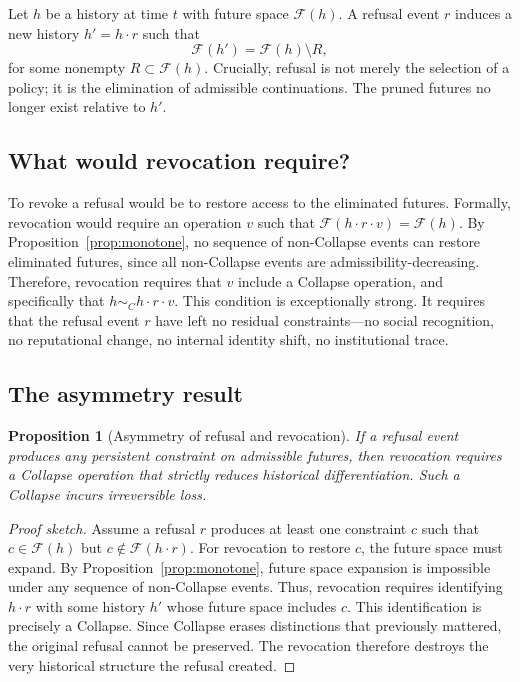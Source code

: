 \documentclass[11pt]{article}
\newtheorem{proposition}{Proposition}
\begin{document}
Let $h$ be a history at time $t$ with future space $\mathcal{F}(h)$. A refusal
event $r$ induces a new history $h' = h \cdot r$ such that
\[
\mathcal{F}(h') = \mathcal{F}(h) \setminus R,
\]
for some nonempty $R \subset \mathcal{F}(h)$. Crucially, refusal is not merely
the selection of a policy; it is the elimination of admissible continuations.
The pruned futures no longer exist relative to $h'$.

\subsection{What would revocation require?}

To revoke a refusal would be to restore access to the eliminated futures.
Formally, revocation would require an operation $v$ such that
$\mathcal{F}(h \cdot r \cdot v) = \mathcal{F}(h)$. By
Proposition~\ref{prop:monotone}, no sequence of non-Collapse events can restore
eliminated futures, since all non-Collapse events are admissibility-decreasing.
Therefore, revocation requires that $v$ include a Collapse operation, and
specifically that $h \sim_C h \cdot r \cdot v$. This condition is exceptionally
strong. It requires that the refusal event $r$ have left no residual
constraints---no social recognition, no reputational change, no internal
identity shift, no institutional trace.

\subsection{The asymmetry result}

\begin{proposition}[Asymmetry of refusal and revocation]
If a refusal event produces any persistent constraint on admissible futures,
then revocation requires a Collapse operation that strictly reduces historical
differentiation. Such a Collapse incurs irreversible loss.
\end{proposition}

\begin{proof}[Proof sketch]
Assume a refusal $r$ produces at least one constraint $c$ such that
$c \in \mathcal{F}(h)$ but $c \notin \mathcal{F}(h \cdot r)$. For revocation
to restore $c$, the future space must expand. By
Proposition~\ref{prop:monotone}, future space expansion is impossible under any
sequence of non-Collapse events. Thus, revocation requires identifying
$h \cdot r$ with some history $h'$ whose future space includes $c$. This
identification is precisely a Collapse. Since Collapse erases distinctions that
previously mattered, the original refusal cannot be preserved. The revocation
therefore destroys the very historical structure the refusal created.
\end{proof}
\end{document}
